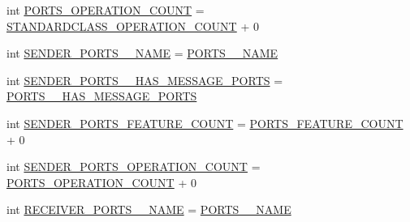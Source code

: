 \begin{DoxyCompactItemize}
\item 
int \hyperlink{interfaceshootingmachineemfmodel_1_1_shootingmachineemfmodel_package_a566f821cfd14b88ba5e0b60e966fb9f3}{P\-O\-R\-T\-S\-\_\-\-O\-P\-E\-R\-A\-T\-I\-O\-N\-\_\-\-C\-O\-U\-N\-T} = \hyperlink{interfaceshootingmachineemfmodel_1_1_shootingmachineemfmodel_package_a2fe5d848cfe0a02fe5609e2c5ed7e7c7}{S\-T\-A\-N\-D\-A\-R\-D\-C\-L\-A\-S\-S\-\_\-\-O\-P\-E\-R\-A\-T\-I\-O\-N\-\_\-\-C\-O\-U\-N\-T} + 0
\item 
int \hyperlink{interfaceshootingmachineemfmodel_1_1_shootingmachineemfmodel_package_a399a22f7885ad9687ceee392efd75115}{S\-E\-N\-D\-E\-R\-\_\-\-P\-O\-R\-T\-S\-\_\-\-\_\-\-N\-A\-M\-E} = \hyperlink{interfaceshootingmachineemfmodel_1_1_shootingmachineemfmodel_package_a19c316778a7ed9961757b257c512945a}{P\-O\-R\-T\-S\-\_\-\-\_\-\-N\-A\-M\-E}
\item 
int \hyperlink{interfaceshootingmachineemfmodel_1_1_shootingmachineemfmodel_package_a32f9aba86ce59940c62b442308c4bf7d}{S\-E\-N\-D\-E\-R\-\_\-\-P\-O\-R\-T\-S\-\_\-\-\_\-\-H\-A\-S\-\_\-\-M\-E\-S\-S\-A\-G\-E\-\_\-\-P\-O\-R\-T\-S} = \hyperlink{interfaceshootingmachineemfmodel_1_1_shootingmachineemfmodel_package_abfa26d954e44f83dadd22a364a5ede44}{P\-O\-R\-T\-S\-\_\-\-\_\-\-H\-A\-S\-\_\-\-M\-E\-S\-S\-A\-G\-E\-\_\-\-P\-O\-R\-T\-S}
\item 
int \hyperlink{interfaceshootingmachineemfmodel_1_1_shootingmachineemfmodel_package_a9db4c8b36712714f6168acc0e9fae4fa}{S\-E\-N\-D\-E\-R\-\_\-\-P\-O\-R\-T\-S\-\_\-\-F\-E\-A\-T\-U\-R\-E\-\_\-\-C\-O\-U\-N\-T} = \hyperlink{interfaceshootingmachineemfmodel_1_1_shootingmachineemfmodel_package_a1ea63d8ed0fd32dbb04f8c83812629eb}{P\-O\-R\-T\-S\-\_\-\-F\-E\-A\-T\-U\-R\-E\-\_\-\-C\-O\-U\-N\-T} + 0
\item 
int \hyperlink{interfaceshootingmachineemfmodel_1_1_shootingmachineemfmodel_package_ad4c59f12e4631c8b76762f9e81227dce}{S\-E\-N\-D\-E\-R\-\_\-\-P\-O\-R\-T\-S\-\_\-\-O\-P\-E\-R\-A\-T\-I\-O\-N\-\_\-\-C\-O\-U\-N\-T} = \hyperlink{interfaceshootingmachineemfmodel_1_1_shootingmachineemfmodel_package_a566f821cfd14b88ba5e0b60e966fb9f3}{P\-O\-R\-T\-S\-\_\-\-O\-P\-E\-R\-A\-T\-I\-O\-N\-\_\-\-C\-O\-U\-N\-T} + 0
\item 
int \hyperlink{interfaceshootingmachineemfmodel_1_1_shootingmachineemfmodel_package_ac5c4a73f5fdcfd72546565f68e6367b9}{R\-E\-C\-E\-I\-V\-E\-R\-\_\-\-P\-O\-R\-T\-S\-\_\-\-\_\-\-N\-A\-M\-E} = \hyperlink{interfaceshootingmachineemfmodel_1_1_shootingmachineemfmodel_package_a19c316778a7ed9961757b257c512945a}{P\-O\-R\-T\-S\-\_\-\-\_\-\-N\-A\-M\-E}
\item 

\end{DoxyCompactItemize}
